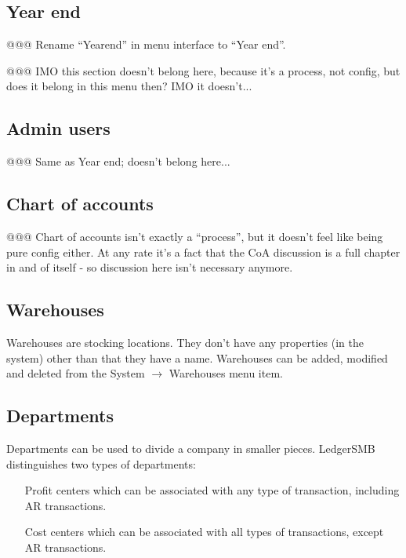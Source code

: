\subsection{Year end}

@@@ Rename ``Yearend'' in menu interface to ``Year end''.


@@@ IMO this section doesn't belong here, because it's a process, not config, but does it belong in this menu then? IMO it doesn't...


\subsection{Admin users}

@@@ Same as Year end; doesn't belong here...

\subsection{Chart of accounts}

@@@ Chart of accounts isn't exactly a ``process'', but it doesn't feel like being pure
config either. At any rate it's a fact that the CoA discussion is a full chapter in and
of itself - so discussion here isn't necessary anymore.

\subsection{Warehouses}

Warehouses are stocking locations. They don't have any properties (in the system)
other than that they have a name. Warehouses can be added, modified and deleted from
the System $\rightarrow$ Warehouses menu item.

\subsection{Departments}

Departments can be used to divide a company in smaller pieces. LedgerSMB distinguishes two
types of departments:

\begin{itemize}
\item [Profit centers] which can be associated with any type of transaction, including AR transactions.
\item [Cost centers] which can be associated with all types of transactions, except AR transactions.
\end{itemize}

